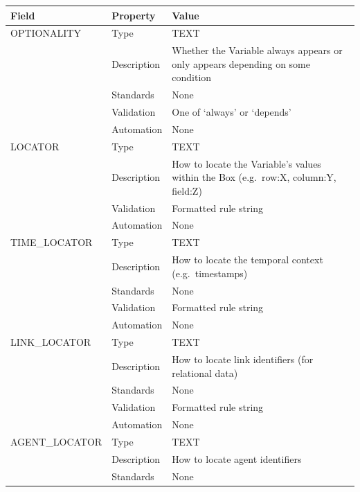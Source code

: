 \begin{longtable}[]{@{}
  >{\raggedright\arraybackslash}p{}
  >{\raggedright\arraybackslash}p{}
  >{\raggedright\arraybackslash}p{}@{}}
\toprule\noalign{}
\begin{minipage}[b]{\linewidth}\raggedright
Field
\end{minipage} & \begin{minipage}[b]{\linewidth}\raggedright
Property
\end{minipage} & \begin{minipage}[b]{\linewidth}\raggedright
Value
\end{minipage} \\
\midrule\noalign{}
\endhead
\bottomrule\noalign{}
\endlastfoot
OPTIONALITY & Type & TEXT \\
& Description & Whether the Variable always appears or only appears
depending on some condition \\
& Standards & None \\
& Validation & One of `always' or `depends' \\
& Automation & None \\
LOCATOR & Type & TEXT \\
& Description & How to locate the Variable's values within the Box
(e.g.~row:X, column:Y, field:Z) \\
& Validation & Formatted rule string \\
& Automation & None \\
TIME\_LOCATOR & Type & TEXT \\
& Description & How to locate the temporal context (e.g.~timestamps) \\
& Standards & None \\
& Validation & Formatted rule string \\
& Automation & None \\
LINK\_LOCATOR & Type & TEXT \\
& Description & How to locate link identifiers (for relational data) \\
& Standards & None \\
& Validation & Formatted rule string \\
& Automation & None \\
AGENT\_LOCATOR & Type & TEXT \\
& Description & How to locate agent identifiers \\
& Standards & None \\

\end{longtable}

